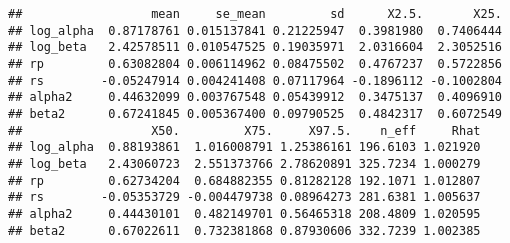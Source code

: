\documentclass[12pt,]{article}
\begin{document}
\begin{verbatim}
##                  mean     se_mean         sd      X2.5.       X25.
## log_alpha  0.87178761 0.015137841 0.21225947  0.3981980  0.7406444
## log_beta   2.42578511 0.010547525 0.19035971  2.0316604  2.3052516
## rp         0.63082804 0.006114962 0.08475502  0.4767237  0.5722856
## rs        -0.05247914 0.004241408 0.07117964 -0.1896112 -0.1002804
## alpha2     0.44632099 0.003767548 0.05439912  0.3475137  0.4096910
## beta2      0.67241845 0.005367400 0.09790525  0.4842317  0.6072549
##                  X50.         X75.     X97.5.    n_eff     Rhat
## log_alpha  0.88193861  1.016008791 1.25386161 196.6103 1.021920
## log_beta   2.43060723  2.551373766 2.78620891 325.7234 1.000279
## rp         0.62734204  0.684882355 0.81282128 192.1071 1.012807
## rs        -0.05353729 -0.004479738 0.08964273 281.6381 1.005637
## alpha2     0.44430101  0.482149701 0.56465318 208.4809 1.020595
## beta2      0.67022611  0.732381868 0.87930606 332.7239 1.002385
\end{verbatim}
\end{document}
